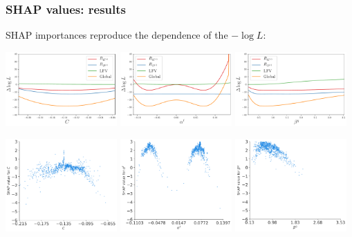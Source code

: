 \documentclass[mathserif, 10pt]{beamer}
\begin{document}
\begin{frame}
    \frametitle{SHAP values: results}
    SHAP importances reproduce the dependence of the $-\log L$:
    \begin{center}
        \includegraphics[width=0.32\textwidth]{figures/evoplot_C.pdf}
        \includegraphics[width=0.32\textwidth]{figures/evoplot_alphal.pdf}
        \includegraphics[width=0.32\textwidth]{figures/evoplot_betaq.pdf}
    \end{center}
    \begin{center}
        \includegraphics[width=0.32\textwidth]{figures/SHAP_C.pdf}
        \includegraphics[width=0.32\textwidth]{figures/SHAP_al.pdf}
        \includegraphics[width=0.32\textwidth]{figures/SHAP_bq.pdf}
    \end{center}
    

\end{frame}
\end{document}
